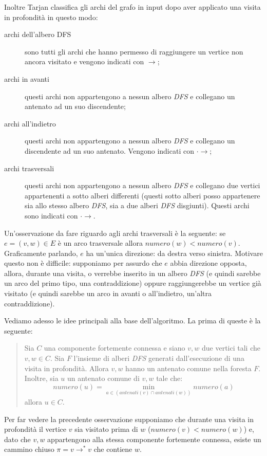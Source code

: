 Inoltre Tarjan classifica gli archi del grafo in input dopo aver
applicato una visita in profondit\`a in questo modo:
\begin{description}
\item[archi dell'albero DFS] sono tutti gli archi che hanno permesso
  di raggiungere un vertice non ancora visitato e vengono indicati con
  $\rightarrow$;
\item[archi in avanti] questi archi non appartengono a nessun albero
  \emph{DFS} e collegano un antenato ad un suo discendente;
\item[archi all'indietro] questi archi non appartengono a nessun
  albero \emph{DFS} e collegano un discendente ad un suo antenato.
  Vengono indicati con $\cdot\rightarrow$;
\item[archi trasversali] questi archi non appartengono a nessun albero
  \emph{DFS} e collegano due vertici appartenenti a sotto alberi
  differenti (questi sotto alberi posso appartenere sia allo stesso
  albero \emph{DFS}, sia a due alberi \emph{DFS} disgiunti). Questi
  archi sono indicati con $\cdot\rightarrow$.
\end{description}
Un'osservazione da fare riguardo agli archi trasversali \`e la
seguente: se $e = (v, w) \in E$ \`e un arco trasversale allora
$numero(w) < numero(v)$. Graficamente parlando, $e$ ha un'unica
direzione: da destra verso sinistra. Motivare questo non \`e
difficile: supponiamo per assurdo che $e$ abbia direzione opposta,
allora, durante una visita, o verrebbe inserito in un albero
\emph{DFS} (e quindi sarebbe un arco del primo tipo, una
contraddizione) oppure raggiungerebbe un vertice gi\`a visitato (e
quindi sarebbe un arco in avanti o all'indietro, un'altra
contraddizione).

Vediamo adesso le idee principali alla base dell'algoritmo. La prima
di queste \`e la seguente:
\begin{quotation}
  Sia $C$ una componente fortemente connessa e siano $v, w$ due
  vertici tali che $v, w \in C$. Sia $F$ l'insieme di alberi
  \emph{DFS} generati dall'esecuzione di una visita in
  profondit\`a. Allora $v, w$ hanno un antenato comune nella foresta
  $F$. Inoltre, sia $u$ un antenato comune di $v, w$ tale che:
  \begin{displaymath}
    numero(u) = \min_{a \in (antenati(v)\cap antenati(w))}{numero(a)}
  \end{displaymath}
  allora $u \in C$.
\end{quotation}
Per far vedere la precedente osservazione supponiamo che durante una
visita in profondit\`a il vertice $v$ sia visitato prima di $w$
($numero(v) < numero(w)$) e, dato che $v,w$ appartengono alla stessa
componente fortemente connessa, esiste un cammino chiuso $\pi = v
\rightarrow^{*} v$ che contiene $w$. 

